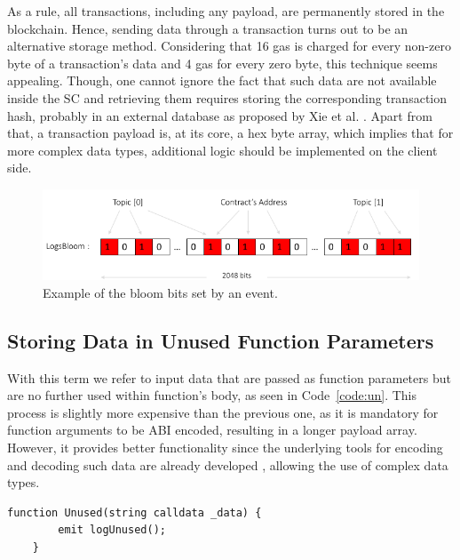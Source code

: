 As a rule, all transactions, including any payload, are permanently stored in the blockchain. Hence, sending data through a transaction turns out to be an alternative storage method. Considering that 16 gas is charged for every non-zero byte of a transaction’s data and 4 gas for every zero byte, this technique seems appealing. Though, one cannot ignore the fact that such data are not available inside the SC and retrieving them requires storing the corresponding transaction hash, probably in an external database as proposed by Xie et al. \citep{xie_2017}. Apart from that, a transaction payload is, at its core, a hex byte array, which implies that for more complex data types, additional logic should be implemented on the client side.

\begin{figure}[htbp]
\centerline{\includegraphics[width=\textwidth]{figs/bloom.pdf}}
\caption{Example of the bloom bits set by an event.}
\label{fig: bloom}
\end{figure}

\subsection{Storing Data in Unused Function Parameters}\label{subsection:}
With this term we refer to input data that are passed as function parameters but are no further used within function’s body, as seen in Code~\ref{code:un}. This process is slightly more expensive than the previous one, as it is mandatory for function arguments to be ABI encoded, resulting in a longer payload array. However, it provides better functionality since the underlying tools for encoding and decoding such data are already developed  \citep{web3}, allowing the use of complex data types.

\vspace{12pt}
\begin{lstlisting}[language=Solidity, label={code:un}, abovecaptionskip=0pt, caption={Basic example of the unused function parameters method.}, captionpos=b]
    function Unused(string calldata _data) {
        emit logUnused(); 
    }
\end{lstlisting}

